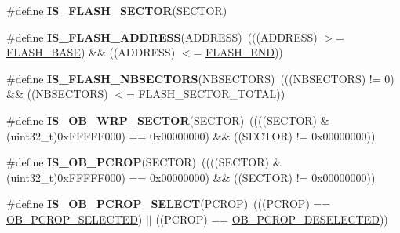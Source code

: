 \begin{DoxyCompactItemize}
\item 
\#define {\bfseries I\+S\+\_\+\+F\+L\+A\+S\+H\+\_\+\+S\+E\+C\+T\+OR}(S\+E\+C\+T\+OR)
\item 
\#define {\bfseries I\+S\+\_\+\+F\+L\+A\+S\+H\+\_\+\+A\+D\+D\+R\+E\+SS}(A\+D\+D\+R\+E\+SS)~(((A\+D\+D\+R\+E\+SS) $>$= \hyperlink{group___peripheral__memory__map_ga23a9099a5f8fc9c6e253c0eecb2be8db}{F\+L\+A\+S\+H\+\_\+\+B\+A\+SE}) \&\& ((A\+D\+D\+R\+E\+SS) $<$= \hyperlink{group___peripheral__memory__map_ga8be554f354e5aa65370f6db63d4f3ee4}{F\+L\+A\+S\+H\+\_\+\+E\+ND}))\hypertarget{group___f_l_a_s_h_ex___i_s___f_l_a_s_h___definitions_gad0c8166ba15a0b8d458412a8bb74e2f0}{}\label{group___f_l_a_s_h_ex___i_s___f_l_a_s_h___definitions_gad0c8166ba15a0b8d458412a8bb74e2f0}

\item 
\#define {\bfseries I\+S\+\_\+\+F\+L\+A\+S\+H\+\_\+\+N\+B\+S\+E\+C\+T\+O\+RS}(N\+B\+S\+E\+C\+T\+O\+RS)~(((N\+B\+S\+E\+C\+T\+O\+RS) != 0) \&\& ((N\+B\+S\+E\+C\+T\+O\+RS) $<$= F\+L\+A\+S\+H\+\_\+\+S\+E\+C\+T\+O\+R\+\_\+\+T\+O\+T\+AL))\hypertarget{group___f_l_a_s_h_ex___i_s___f_l_a_s_h___definitions_ga5b85e63e0066bf7ca518cb3790ad67e0}{}\label{group___f_l_a_s_h_ex___i_s___f_l_a_s_h___definitions_ga5b85e63e0066bf7ca518cb3790ad67e0}

\item 
\#define {\bfseries I\+S\+\_\+\+O\+B\+\_\+\+W\+R\+P\+\_\+\+S\+E\+C\+T\+OR}(S\+E\+C\+T\+OR)~((((S\+E\+C\+T\+OR) \& (uint32\+\_\+t)0x\+F\+F\+F\+F\+F000) == 0x00000000) \&\& ((\+S\+E\+C\+T\+O\+R) != 0x00000000))\hypertarget{group___f_l_a_s_h_ex___i_s___f_l_a_s_h___definitions_gade36d0d5f5de92caf5a5e7ee22394b87}{}\label{group___f_l_a_s_h_ex___i_s___f_l_a_s_h___definitions_gade36d0d5f5de92caf5a5e7ee22394b87}

\item 
\#define {\bfseries I\+S\+\_\+\+O\+B\+\_\+\+P\+C\+R\+OP}(S\+E\+C\+T\+OR)~((((S\+E\+C\+T\+OR) \& (uint32\+\_\+t)0x\+F\+F\+F\+F\+F000) == 0x00000000) \&\& ((\+S\+E\+C\+T\+O\+R) != 0x00000000))\hypertarget{group___f_l_a_s_h_ex___i_s___f_l_a_s_h___definitions_ga4366c6db141b2c0024429b5808eef6e8}{}\label{group___f_l_a_s_h_ex___i_s___f_l_a_s_h___definitions_ga4366c6db141b2c0024429b5808eef6e8}

\item 
\#define {\bfseries I\+S\+\_\+\+O\+B\+\_\+\+P\+C\+R\+O\+P\+\_\+\+S\+E\+L\+E\+CT}(P\+C\+R\+OP)~(((P\+C\+R\+OP) == \hyperlink{group___f_l_a_s_h_ex___selection___protection___mode_ga7de2d3d5fc3baa922d43850a2f140dfc}{O\+B\+\_\+\+P\+C\+R\+O\+P\+\_\+\+S\+E\+L\+E\+C\+T\+ED}) $\vert$$\vert$ ((P\+C\+R\+OP) == \hyperlink{group___f_l_a_s_h_ex___selection___protection___mode_gaa11bc40819552615d0618b0df99120b1}{O\+B\+\_\+\+P\+C\+R\+O\+P\+\_\+\+D\+E\+S\+E\+L\+E\+C\+T\+ED}))\hypertarget{group___f_l_a_s_h_ex___i_s___f_l_a_s_h___definitions_ga917bc3381ebf7106868915928c3eaa2e}{}\label{group___f_l_a_s_h_ex___i_s___f_l_a_s_h___definitions_ga917bc3381ebf7106868915928c3eaa2e}

\end{DoxyCompactItemize}


